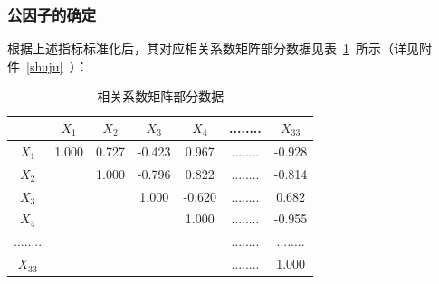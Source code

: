 \documentclass{whutmod}
\begin{document}
	\subsubsection{公因子的确定}
	根据上述指标标准化后，其对应相关系数矩阵部分数据见表~\ref{shuju2}~所示（详见附件~\ref{shuju}~）：
	\begin{table}[H]
		 \centering
		\caption{相关系数矩阵部分数据}\label{shuju2}
		\begin{tabular}{ccccccc}
			\toprule[2pt]
			\multicolumn{1}{m{1cm}}{\centering } &
			\multicolumn{1}{m{2cm}}{\centering $X_{1}$} & \multicolumn{1}{m{2cm}}{\centering $X_{2}$} & \multicolumn{1}{m{2cm}}{\centering $X_{3}$}&
			\multicolumn{1}{m{2cm}}{\centering $X_{4}$}&
			\multicolumn{1}{m{1cm}}{\centering ........} &
			\multicolumn{1}{m{2cm}}{\centering $X_{33}$}
			\\
				\midrule[1pt]
			$X_{1}$&1.000	 &  0.727 & -0.423&0.967&........& -0.928\\ 
			$X_{2}$& &  1.000 & -0.796&0.822&........&-0.814\\ 
			$X_{3}$& &   & 1.000&-0.620&........&0.682\\ 
			$X_{4}$& &   & &1.000&........&-0.955\\ 
			........& &   & & &........&........\\ 
			$X_{33}$& &   & & &........&1.000\\
			\bottomrule[2pt]
		\end{tabular}
	\end{table}
	
\end{document}
